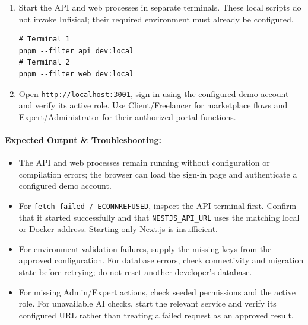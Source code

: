 \begin{enumerate}[leftmargin=1.8em,itemsep=3pt]
\item Start the API and web processes in separate terminals. These local scripts do not invoke Infisical; their required environment must already be configured.
\begin{lstlisting}[frame=single,backgroundcolor=\color{codebg}]
# Terminal 1
pnpm --filter api dev:local
# Terminal 2
pnpm --filter web dev:local
\end{lstlisting}
\item Open \texttt{http://localhost:3001}, sign in using the configured demo account and verify its active role. Use Client/Freelancer for marketplace flows and Expert/Administrator for their authorized portal functions.
\end{enumerate}

\paragraph{Expected Output \& Troubleshooting:}
\begin{itemize}[leftmargin=1.5em,itemsep=2pt]
\item The API and web processes remain running without configuration or compilation errors; the browser can load the sign-in page and authenticate a configured demo account.
\item For \texttt{fetch failed / ECONNREFUSED}, inspect the API terminal first. Confirm that it started successfully and that \texttt{NESTJS\_API\_URL} uses the matching local or Docker address. Starting only Next.js is insufficient.
\item For environment validation failures, supply the missing keys from the approved configuration. For database errors, check connectivity and migration state before retrying; do not reset another developer's database.
\item For missing Admin/Expert actions, check seeded permissions and the active role. For unavailable AI checks, start the relevant service and verify its configured URL rather than treating a failed request as an approved result.
\end{itemize}

